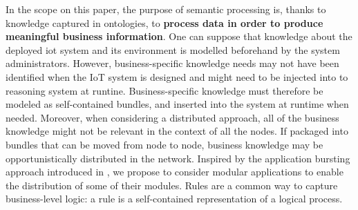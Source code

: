 \documentclass[sw]{iosart2x}
\begin{document}
In the scope on this paper, the  purpose of semantic processing is, thanks to knowledge captured in ontologies, to \textbf{process data in order to produce meaningful business information}. 
One can suppose that knowledge about the deployed \gls{iot} system and its environment is modelled beforehand by the system administrators.
However, business-specific knowledge needs may not have been identified when the IoT system is designed and might need to be injected into to reasoning system at runtine.
Business-specific knowledge must therefore be modeled as self-contained bundles, and inserted into the system at runtime when needed.
Moreover, when considering a distributed approach, all of the business knowledge might not be relevant in the context of all the nodes. 
If packaged into bundles that can be moved from node to node, business knowledge may be opportunistically distributed in the network. 
Inspired by the application bursting approach introduced in \cite{Charrada2016}, we propose to consider modular applications to enable the distribution of some of their modules.
Rules are a common way to capture business-level logic: a rule is a self-contained representation of a logical process.
\end{document}
